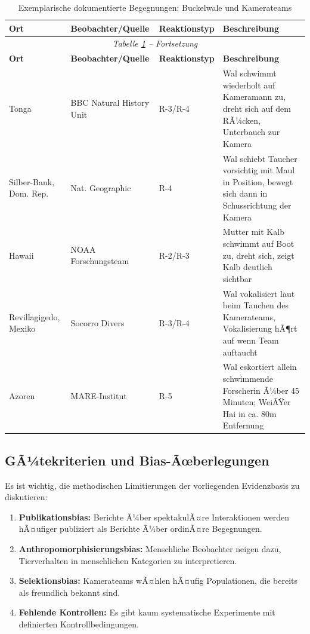 ﻿\documentclass[12pt,a4paper]{article}
\theoremstyle{definition}
\theoremstyle{remark}
\begin{document}
\begin{longtable}{p{2cm}p{3cm}p{2.5cm}p{5cm}}
  \caption{Exemplarische dokumentierte Begegnungen: Buckelwale und Kamerateams}
  \label{tab:begegnungen}\\
  \toprule
  \textbf{Ort} & \textbf{Beobachter/Quelle} & \textbf{Reaktionstyp} & \textbf{Beschreibung} \\
  \midrule
  \endfirsthead
  \multicolumn{4}{c}{\textit{Tabelle \ref{tab:begegnungen} -- Fortsetzung}} \\
  \toprule
  \textbf{Ort} & \textbf{Beobachter/Quelle} & \textbf{Reaktionstyp} & \textbf{Beschreibung} \\
  \midrule
  \endhead
  \bottomrule
  \endfoot
  Tonga & BBC Natural History Unit & R-3/R-4 & Wal schwimmt wiederholt auf Kameramann zu,
  dreht sich auf dem RÃ¼cken, Unterbauch zur Kamera \\[4pt]
  Silber-Bank, Dom. Rep. & Nat. Geographic & R-4 & Wal schiebt Taucher vorsichtig mit
  Maul in Position, bewegt sich dann in Schussrichtung der Kamera \\[4pt]
  Hawaii & NOAA Forschungsteam & R-2/R-3 & Mutter mit Kalb schwimmt auf Boot zu,
  dreht sich, zeigt Kalb deutlich sichtbar \\[4pt]
  Revillagigedo, Mexiko & Socorro Divers & R-3/R-4 & Wal vokalisiert laut beim
  Tauchen des Kamerateams, Vokalisierung hÃ¶rt auf wenn Team auftaucht \\[4pt]
  Azoren & MARE-Institut & R-5 & Wal eskortiert allein schwimmende Forscherin
  Ã¼ber 45 Minuten; WeiÃŸer Hai in ca. 80m Entfernung \\
\end{longtable}

\subsection{GÃ¼tekriterien und Bias-Ãœberlegungen}

Es ist wichtig, die methodischen Limitierungen der vorliegenden Evidenzbasis
zu diskutieren:

\begin{enumerate}
  \item \textbf{Publikationsbias:} Berichte Ã¼ber spektakulÃ¤re Interaktionen
        werden hÃ¤ufiger publiziert als Berichte Ã¼ber ordinÃ¤re Begegnungen.
  \item \textbf{Anthropomorphisierungsbias:} Menschliche Beobachter neigen
        dazu, Tierverhalten in menschlichen Kategorien zu interpretieren.
  \item \textbf{Selektionsbias:} Kamerateams wÃ¤hlen hÃ¤ufig Populationen,
        die bereits als freundlich bekannt sind.
  \item \textbf{Fehlende Kontrollen:} Es gibt kaum systematische Experimente
        mit definierten Kontrollbedingungen.
\end{enumerate}
\end{document}
